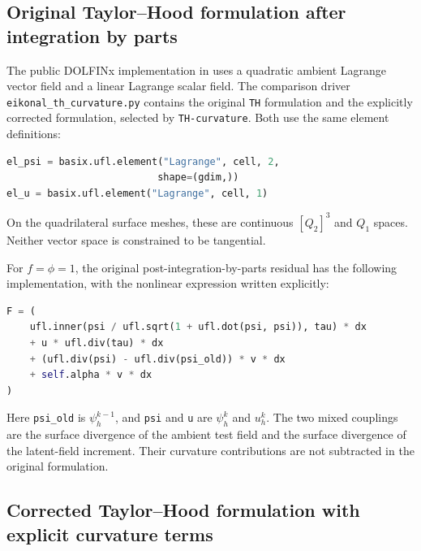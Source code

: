 \documentclass[11pt,a4paper]{article}
\newcommand{\code}[1]{\texttt{#1}}
\begin{document}
\subsection{Original Taylor--Hood formulation after integration by parts}

The public DOLFINx implementation in \cite{upstream} uses a quadratic
ambient Lagrange vector field and a linear Lagrange scalar field.
The comparison driver \code{eikonal\_th\_curvature.py}
contains the original \code{TH} formulation and the explicitly corrected
formulation, selected by \code{TH-curvature}. Both use the same element
definitions:
\begin{lstlisting}[language=Python]
el_psi = basix.ufl.element("Lagrange", cell, 2,
                          shape=(gdim,))
el_u = basix.ufl.element("Lagrange", cell, 1)
\end{lstlisting}
On the quadrilateral surface meshes, these are continuous
$[Q_2]^3$ and $Q_1$ spaces. Neither vector space is constrained to be
tangential.

For $f=\phi=1$, the original post-integration-by-parts residual has the
following implementation, with the nonlinear expression written explicitly:
\begin{lstlisting}[language=Python]
F = (
    ufl.inner(psi / ufl.sqrt(1 + ufl.dot(psi, psi)), tau) * dx
    + u * ufl.div(tau) * dx
    + (ufl.div(psi) - ufl.div(psi_old)) * v * dx
    + self.alpha * v * dx
)
\end{lstlisting}
Here \code{psi\_old} is $\psi_h^{k-1}$, and \code{psi} and \code{u}
are $\psi_h^k$ and $u_h^k$. The two mixed couplings are the surface
divergence of the ambient test field and the surface divergence of the
latent-field increment. Their curvature contributions are not subtracted
in the original formulation.

\subsection{Corrected Taylor--Hood formulation with explicit curvature terms}
\end{document}
